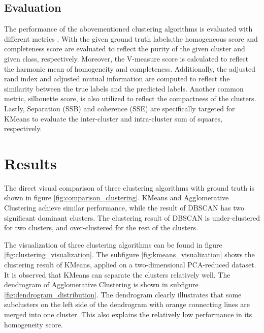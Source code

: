 \documentclass[12pt,a4paper]{article}
\begin{document}
\subsection{Evaluation}\label{subsec:evaluation}
The performance of the abovementioned clustering algorithms is evaluated with different metrics \cite{scikit-learn_clustering}. 
With the given ground truth labels,the homogeneous score and completeness score are evaluated to reflect the purity of the given cluster and given class, respectively.
Moreover, the V-measure score is calculated to reflect the harmonic mean of homogeneity and completeness. 
Additionally, the adjusted rand index and adjusted mutual information are computed to reflect the similarity between the true labels and the predicted labels. 
Another common metric, silhouette score, is also utilized to reflect the compactness of the clusters. 
Lastly, Separation (SSB) and coherence (SSE) are specifically targeted for KMeans to evaluate the inter-cluster and intra-cluster sum of squares, respectively.



\section{Results}\label{sec:results}
The direct visual comparison of three clustering algorithms with ground truth is shown in figure \ref{fig:comparison_clustering}. 
KMeans and Agglomerative Clustering achieve similar performance, while the result of DBSCAN has two significant dominant clusters. 
The clustering result of DBSCAN is under-clustered for two clusters, and over-clustered for the rest of the clusters.

The visualization of three clustering algorithms can be found in figure \ref{fig:clustering_visualization}. 
The subfigure \ref{fig:kmeans_visualization} shows the clustering result of KMeans, applied on a two-dimensional PCA-reduced dataset. It is observed that KMeans can separate the clusters relatively well.
The dendrogram of Agglomerative Clustering is shown in subfigure \ref{fig:dendrogram_distribution}. 
The dendrogram clearly illustrates that some subclusters on the left side of the dendrogram with orange connecting lines are merged into one cluster. 
This also explains the relatively low performance in its homogeneity score.
\end{document}
